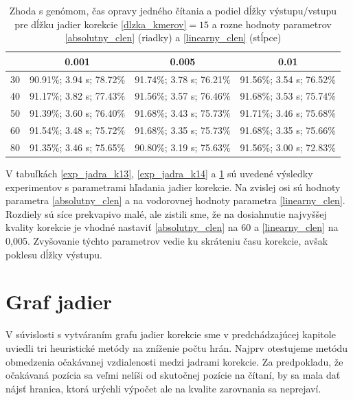 \begin{table}
    \fontsize{11}{13}\selectfont
    \centering
    \begin{tabular}{ | l || c | c | c | }
    \hline 
& 0.001& 0.005& 0.01 \\ \hline \hline
30 & 90.91\%; 3.94 s; 78.72\% & 91.74\%; 3.78 s; 76.21\% & 91.56\%; 3.54 s; 76.52\% \\ \hline
40 & 91.17\%; 3.82 s; 77.43\% & 91.56\%; 3.57 s; 76.46\% & 91.68\%; 3.53 s; 75.74\% \\ \hline
50 & 91.39\%; 3.60 s; 76.40\% & 91.68\%; 3.43 s; 75.73\% & 91.71\%; 3.46 s; 75.68\% \\ \hline
60 & 91.54\%; 3.48 s; 75.72\% & 91.68\%; 3.35 s; 75.73\% & 91.68\%; 3.35 s; 75.66\% \\ \hline
80 & 91.35\%; 3.46 s; 75.65\% & 90.80\%; 3.19 s; 75.63\% & 91.56\%; 3.00 s; 72.83\% \\ \hline
    \end{tabular}
    \caption{Zhoda s genómom, čas opravy jedného čítania a podiel dĺžky výstupu/vstupu pre dĺžku jadier korekcie \ref{dlzka_kmerov}$ = 15$ a rozne hodnoty parametrov \ref{absolutny_clen} (riadky) a \ref{linearny_clen} (stĺpce)}
    \label{exp_jadra_k15}
\end{table}

V tabuľkách \ref{exp_jadra_k13}, \ref{exp_jadra_k14} a \ref{exp_jadra_k15} sú uvedené výsledky experimentov s parametrami hľadania jadier korekcie. Na zvislej osi sú hodnoty parametra \ref{absolutny_clen} a na vodorovnej hodnoty parametra \ref{linearny_clen}. Rozdiely sú síce prekvapivo malé, ale zistili sme, že na dosiahnutie najvyššej kvality korekcie je vhodné nastaviť \ref{absolutny_clen} na 60 a \ref{linearny_clen} na 0,005. Zvyšovanie týchto parametrov vedie ku skráteniu času korekcie, avšak poklesu dĺžky výstupu.


\section{Graf jadier}

V súvislosti s vytváraním grafu jadier korekcie sme v predchádzajúcej kapitole uviedli tri heuristické metódy na zníženie počtu hrán. Najprv otestujeme metódu obmedzenia očakávanej vzdialenosti medzi jadrami korekcie. Za predpokladu, že očakávaná pozícia sa veľmi nelíši od skutočnej pozície na čítaní, by sa mala dať nájsť hranica, ktorá urýchli výpočet ale na kvalite zarovnania sa neprejaví.

